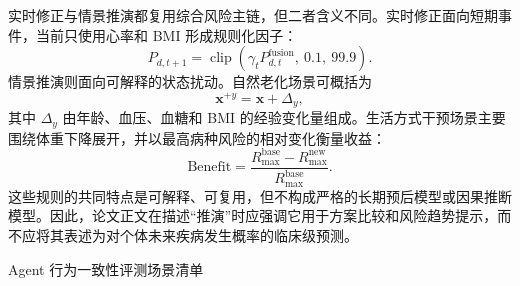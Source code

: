 \documentclass[UTF8, a4paper, 12pt, oneside]{ctexrep}
\numberwithin{equation}{chapter}
\begin{document}
{\vspace{\baselineskip}
实时修正与情景推演都复用综合风险主链，但二者含义不同。实时修正面向短期事件，当前只使用心率和 BMI 形成规则化因子：
\begin{equation*}
P_{d,t+1} =
\operatorname{clip}\!\left(\gamma_t P_{d,t}^{\mathrm{fusion}},\ 0.1,\ 99.9\right).
\tag{附2-3}
\end{equation*}
情景推演则面向可解释的状态扰动。自然老化场景可概括为
\begin{equation*}
\mathbf{x}^{+y} = \mathbf{x} + \Delta_y,
\tag{附2-4}
\end{equation*}
其中 \(\Delta_y\) 由年龄、血压、血糖和 BMI 的经验变化量组成。生活方式干预场景主要围绕体重下降展开，并以最高病种风险的相对变化衡量收益：
\begin{equation*}
\mathrm{Benefit} =
\frac{R_{\max}^{\mathrm{base}} - R_{\max}^{\mathrm{new}}}
{R_{\max}^{\mathrm{base}}}.
\tag{附2-5}
\end{equation*}
这些规则的共同特点是可解释、可复用，但不构成严格的长期预后模型或因果推断模型。因此，论文正文在描述“推演”时应强调它用于方案比较和风险趋势提示，而不应将其表述为对个体未来疾病发生概率的临床级预测。
\par}
\clearpage

{}
\begin{center}
{\heiti{} Agent 行为一致性评测场景清单\par}
\end{center}
\vspace{0.5\baselineskip}
\end{document}
